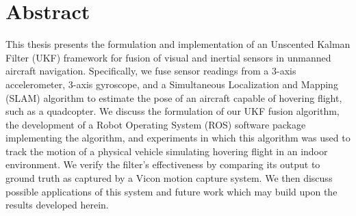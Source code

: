 \chapter*{Abstract}

This thesis presents the formulation and implementation of an Unscented Kalman Filter (UKF) framework for fusion of visual and inertial sensors in unmanned aircraft navigation. Specifically, we fuse sensor readings from a 3-axis accelerometer, 3-axis gyroscope, and a Simultaneous Localization and Mapping (SLAM) algorithm to estimate the pose of an aircraft capable of hovering flight, such as a quadcopter. We discuss the formulation of our UKF fusion algorithm, the development of a Robot Operating System (ROS) software package implementing the algorithm, and experiments in which this algorithm was used to track the motion of a physical vehicle simulating hovering flight in an indoor environment. We verify the filter's effectiveness by comparing its output to ground truth as captured by a Vicon motion capture system. We then discuss possible applications of this system and future work which may build upon the results developed herein.